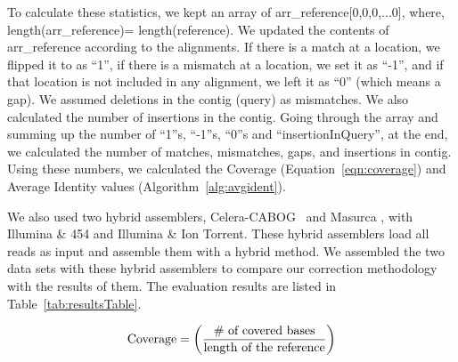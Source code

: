 \documentclass{llncs}
\begin{document}
To calculate these statistics, we kept an array of arr{\_}reference[0,0,0,...0], where,
\\length(arr{\_}reference)= length(reference). 
We updated the contents of arr{\_}reference according to the alignments. 
If there is a match at a location, we flipped it to  as ``1'', if there is a mismatch at a location, 
we set it as ``-1'', and if that location is not included in any alignment, we left it as ``0'' 
(which means a gap). We assumed deletions in the contig (query) as mismatches. 
We also calculated the number of insertions in the contig. 
Going through the array and summing up the number of ``1''s, ``-1''s, ``0''s and ``insertionInQuery'', at the end, we calculated the number of matches, mismatches, gaps, and insertions in contig. 
Using these numbers, we calculated the Coverage  (Equation~\ref{eqn:coverage}) and Average Identity values (Algorithm~\ref{alg:avgident}).

We also used two hybrid assemblers, Celera-CABOG~\cite{cabogMiller:2008} and Masurca \cite{masurcaZimin:2013}, with Illumina \& 454 and Illumina \& Ion Torrent. These hybrid assemblers load all reads as input and assemble them with a hybrid method. We assembled the two data sets with these hybrid assemblers to compare our correction methodology with the results of them. 
The evaluation results are listed in Table~\ref{tab:resultsTable}. 


\begin{equation}
\label{eqn:coverage}
\textnormal{Coverage} = \left(\frac{\textnormal{\#{ }of{ }covered{ }bases}}{\textnormal{length of the reference}}\right)
\end{equation}


\end{document}
